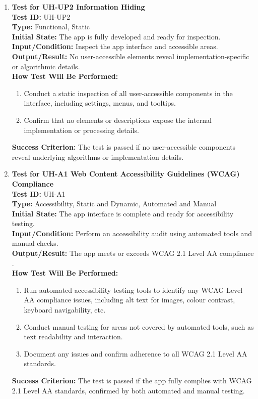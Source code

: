 \documentclass[12pt, titlepage]{article}
\begin{document}
\begin{enumerate}
    \item \textbf{Test for UH-UP2 Information Hiding} \\
      \newline
      \textbf{Test ID:} UH-UP2 \\
      \textbf{Type:} Functional, Static \\
      \textbf{Initial State:} The app is fully developed and ready for inspection. \\
      \textbf{Input/Condition:} Inspect the app interface and accessible areas. \\
      \textbf{Output/Result:} No user-accessible elements reveal implementation-specific or algorithmic details. \\
      \textbf{How Test Will Be Performed:}
      \begin{enumerate}
          \item Conduct a static inspection of all user-accessible components in the interface, including settings, menus, and tooltips.
          \item Confirm that no elements or descriptions expose the internal implementation or processing details.
      \end{enumerate}
      \textbf{Success Criterion:} The test is passed if no user-accessible components reveal underlying algorithms or implementation details.

    \item \textbf{Test for UH-A1 Web Content Accessibility Guidelines (WCAG) Compliance} \\
      \newline
      \textbf{Test ID:} UH-A1 \\
      \textbf{Type:} Accessibility, Static and Dynamic, Automated and Manual \\
      \textbf{Initial State:} The app interface is complete and ready for accessibility testing. \\
      \textbf{Input/Condition:} Perform an accessibility audit using automated tools and manual checks. \\
      \textbf{Output/Result:} The app meets or exceeds WCAG 2.1 Level AA compliance \cite{WCAG21}. \\
      \textbf{How Test Will Be Performed:}
      \begin{enumerate}
          \item Run automated accessibility testing tools to identify any WCAG Level AA compliance issues, including alt text for images, colour contrast, keyboard navigability, etc.
          \item Conduct manual testing for areas not covered by automated tools, such as text readability and interaction.
          \item Document any issues and confirm adherence to all WCAG 2.1 Level AA standards.
      \end{enumerate}
      \textbf{Success Criterion:} The test is passed if the app fully complies with WCAG 2.1 Level AA standards, confirmed by both automated and manual testing.
\end{enumerate}
\end{document}
